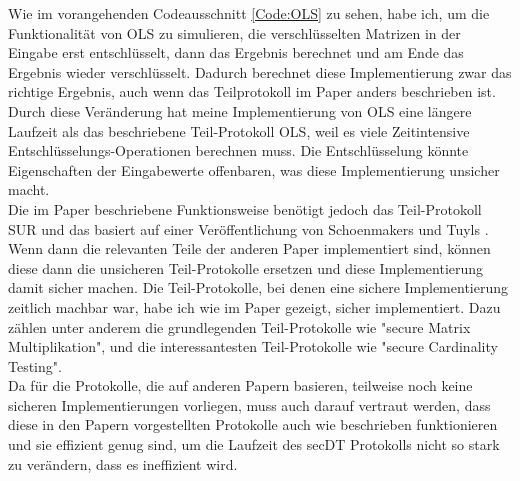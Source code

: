 Wie im vorangehenden Codeausschnitt \ref{Code:OLS} zu sehen, habe ich, um die Funktionalität von OLS zu simulieren, die verschlüsselten Matrizen in der Eingabe erst entschlüsselt, dann das Ergebnis berechnet und am Ende das Ergebnis wieder verschlüsselt. Dadurch berechnet diese Implementierung zwar das richtige Ergebnis, auch wenn das Teilprotokoll im Paper \cite{Doettling2021} anders beschrieben ist. Durch diese Veränderung hat meine Implementierung von OLS eine längere Laufzeit als das beschriebene Teil-Protokoll OLS, weil es viele Zeitintensive Entschlüsselungs-Operationen berechnen muss. Die Entschlüsselung könnte Eigenschaften der Eingabewerte offenbaren, was diese Implementierung unsicher macht.\\
Die im Paper beschriebene Funktionsweise benötigt jedoch das Teil-Protokoll SUR und das basiert auf einer Veröffentlichung von Schoenmakers und Tuyls \cite{Schoenmakers}.
Wenn dann die relevanten Teile der anderen Paper implementiert sind, können diese dann die unsicheren Teil-Protokolle ersetzen und diese Implementierung damit sicher machen.
Die Teil-Protokolle, bei denen eine sichere Implementierung zeitlich machbar war, habe ich wie im Paper gezeigt, sicher implementiert. Dazu zählen unter anderem die grundlegenden Teil-Protokolle wie "secure Matrix Multiplikation", und die interessantesten Teil-Protokolle wie "secure Cardinality Testing".\\
Da für die Protokolle, die auf anderen Papern basieren, teilweise noch keine sicheren Implementierungen vorliegen, muss auch darauf vertraut werden, dass diese in den Papern vorgestellten Protokolle auch wie beschrieben funktionieren und sie effizient genug sind, um die Laufzeit des secDT Protokolls nicht so stark zu verändern, dass es ineffizient wird.\\


